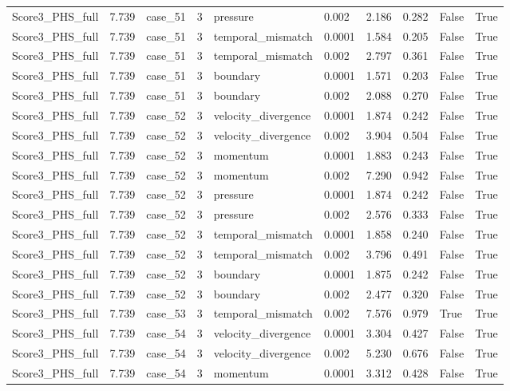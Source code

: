 \begin{longtable}{llllllllll}
Score3\_PHS\_full & 7.739 & case\_51 & 3 & pressure & 0.002 & 2.186 & 0.282 & False & True \\
Score3\_PHS\_full & 7.739 & case\_51 & 3 & temporal\_mismatch & 0.0001 & 1.584 & 0.205 & False & True \\
Score3\_PHS\_full & 7.739 & case\_51 & 3 & temporal\_mismatch & 0.002 & 2.797 & 0.361 & False & True \\
Score3\_PHS\_full & 7.739 & case\_51 & 3 & boundary & 0.0001 & 1.571 & 0.203 & False & True \\
Score3\_PHS\_full & 7.739 & case\_51 & 3 & boundary & 0.002 & 2.088 & 0.270 & False & True \\
Score3\_PHS\_full & 7.739 & case\_52 & 3 & velocity\_divergence & 0.0001 & 1.874 & 0.242 & False & True \\
Score3\_PHS\_full & 7.739 & case\_52 & 3 & velocity\_divergence & 0.002 & 3.904 & 0.504 & False & True \\
Score3\_PHS\_full & 7.739 & case\_52 & 3 & momentum & 0.0001 & 1.883 & 0.243 & False & True \\
Score3\_PHS\_full & 7.739 & case\_52 & 3 & momentum & 0.002 & 7.290 & 0.942 & False & True \\
Score3\_PHS\_full & 7.739 & case\_52 & 3 & pressure & 0.0001 & 1.874 & 0.242 & False & True \\
Score3\_PHS\_full & 7.739 & case\_52 & 3 & pressure & 0.002 & 2.576 & 0.333 & False & True \\
Score3\_PHS\_full & 7.739 & case\_52 & 3 & temporal\_mismatch & 0.0001 & 1.858 & 0.240 & False & True \\
Score3\_PHS\_full & 7.739 & case\_52 & 3 & temporal\_mismatch & 0.002 & 3.796 & 0.491 & False & True \\
Score3\_PHS\_full & 7.739 & case\_52 & 3 & boundary & 0.0001 & 1.875 & 0.242 & False & True \\
Score3\_PHS\_full & 7.739 & case\_52 & 3 & boundary & 0.002 & 2.477 & 0.320 & False & True \\
Score3\_PHS\_full & 7.739 & case\_53 & 3 & temporal\_mismatch & 0.002 & 7.576 & 0.979 & True & True \\
Score3\_PHS\_full & 7.739 & case\_54 & 3 & velocity\_divergence & 0.0001 & 3.304 & 0.427 & False & True \\
Score3\_PHS\_full & 7.739 & case\_54 & 3 & velocity\_divergence & 0.002 & 5.230 & 0.676 & False & True \\
Score3\_PHS\_full & 7.739 & case\_54 & 3 & momentum & 0.0001 & 3.312 & 0.428 & False & True \\

\end{longtable}
